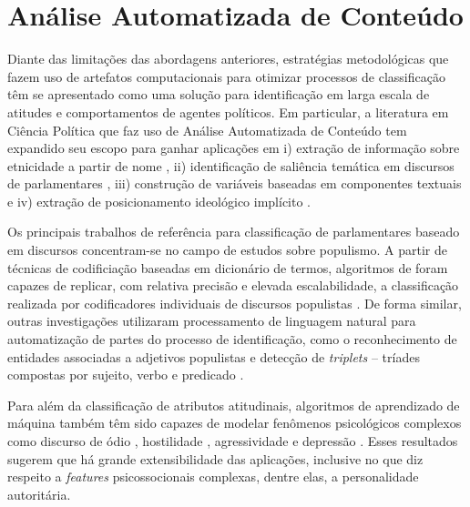 \documentclass[
12pt,				%
openright,			%
twoside,			%
a4paper,			%
english,			%
french,				%
spanish,			%
brazil				%
]{abntex2}
\begin{document}
\section{Análise Automatizada de Conteúdo}

Diante das limitações das abordagens anteriores, estratégias metodológicas que fazem uso de artefatos computacionais para otimizar processos de classificação têm se apresentado como uma solução para identificação em larga escala de atitudes e comportamentos de agentes políticos. Em particular, a literatura em Ciência Política que faz uso de Análise Automatizada de Conteúdo tem expandido seu escopo para ganhar aplicações em i) extração de informação sobre etnicidade a partir de nome \cite{roberts2016introduction}, ii) identificação de saliência temática em discursos de parlamentares \cite{batista2016mensurando, moreira2016palavra}, iii) construção de variáveis baseadas em componentes textuais \cite{curini2015conditional} e iv) extração de posicionamento ideológico implícito \cite{slapin2008scaling, ceron2016first}.

Os principais trabalhos de referência para classificação de parlamentares baseado em discursos concentram-se no campo de estudos sobre populismo. A partir de técnicas de codificiação baseadas em dicionário de termos, algoritmos de foram capazes de replicar, com relativa precisão e elevada escalabilidade, a classificação realizada por codificadores individuais de discursos populistas \cite{pauwels2011measuring, rooduijn2011measuring, oliver2016rise}. De forma similar, outras investigações utilizaram processamento de linguagem natural para automatização de partes do processo de identificação, como o reconhecimento de entidades associadas a adjetivos populistas \cite{kyle2018populists} e detecção de \emph{triplets} -- tríades compostas por sujeito, verbo e predicado \cite{aslanidis2018measuring}.

Para além da classificação de atributos atitudinais, algoritmos de aprendizado de máquina também têm sido capazes de modelar fenômenos psicológicos complexos como discurso de ódio \cite{davidson2017automated, zampieri2019predicting}, hostilidade \cite{hopp2017does, vargo2017socioeconomic, liu2018forecasting}, agressividade \cite{orasan2018aggressive, sahay2018detecting, nikhil2018lstms} e depressão \cite{mowery2016identifying, chekroud2016cross, orabi2018deep}. Esses resultados sugerem que há grande extensibilidade das aplicações, inclusive no que diz respeito a \emph{features} psicossocionais complexas, dentre elas, a personalidade autoritária.
\end{document}
